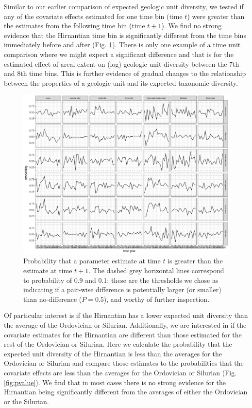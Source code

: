\documentclass[12pt,letterpaper]{article}
\begin{document}
Similar to our earlier comparison of expected geologic unit diversity, we tested if any of the covariate effects estimated for one time bin (time \(t\)) were greater than the estimates from the following time bin (time \(t + 1\)). We find no strong evidence that the Hirnantian time bin is significantly different from the time bins immediately before and after (Fig. \ref{fig:diff_cov}). There is only one example of a time unit comparison where we might expect a significant difference and that is for the estimated effect of areal extent on (log) geologic unit diversity between the 7th and 8th time bins. This is further evidence of gradual changes to the relationship between the properties of a geologic unit and its expected taxonomic diversity.
\begin{figure}[ht]
  \centering
  \includegraphics[width=\textwidth,height=0.5\textheight,keepaspectratio=true]{figure/cov_diff_diversity}
  \caption{Probability that a parameter estimate at time \(t\) is greater than the estimate at time \(t + 1\). The dashed grey horizontal lines correspond to probability of 0.9 and 0.1; these are the thresholds we chose as indicating if a pair-wise difference is potentially larger (or smaller) than no-difference (\(P = 0.5\)), and worthy of further inspection.}
  \label{fig:diff_cov}
\end{figure}




Of particular interest is if the Hirnantian has a lower expected unit diversity than the average of the Ordovician or Silurian. Additionally, we are interested in if the covariate estimates for the Hirnantian are different than those estimated for the rest of the Ordovician or Silurian. Here we calculate the probability that the expected unit diversity of the Hirnantian is less than the averages for the Ordovician or Silurian and compare those estimates to the probabilities that the covariate effects are less than the averages for the Ordovician or Silurian (Fig. \ref{fig:pvalue}). We find that in most cases there is no strong evidence for the Hirnantian being significantly different from the averages of either the Ordovician or the Silurian. 
\end{document}
